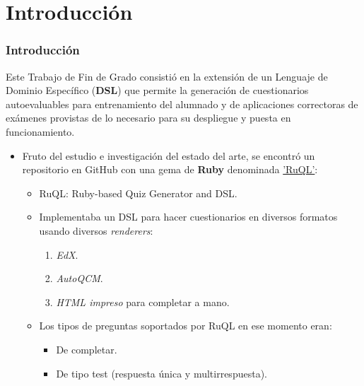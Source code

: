 \documentclass{beamer}
\begin{document}
\section{Introducción}
\begin{frame}[allowframebreaks]
  \frametitle{Introducción}
  
  \begin{center}
    Este Trabajo de Fin de Grado consistió en la extensión de un Lenguaje de Dominio Específico ({\bfseries DSL}) que permite la
    generación de cuestionarios autoevaluables para entrenamiento del alumnado y de aplicaciones correctoras de exámenes
    provistas de lo necesario para su despliegue y puesta en funcionamiento.
  \end{center}
  \framebreak
  
  \begin{itemize}
    \item Fruto del estudio e investigación del estado del arte, se encontró un repositorio en GitHub con una gema de {\bfseries Ruby} denominada 
    \href{http://github.com/saasbook/ruql}{'RuQL'}:
    \begin{itemize}
      \item RuQL: Ruby-based Quiz Generator and DSL.
      \item Implementaba un DSL para hacer cuestionarios en diversos formatos usando diversos \textit{renderers}:
      \begin{enumerate}
        \item \textit{EdX}.
        \item \textit{AutoQCM}.
        \item \textit{HTML impreso} para completar a mano.
      \end{enumerate}
      \item Los tipos de preguntas soportados por RuQL en ese momento eran: 
      \begin{itemize}
        \item De completar.
        \item De tipo test (respuesta única y multirrespuesta).
      \end{itemize}
    \end{itemize}
  \end{itemize}
  \framebreak
  

\end{frame}
\end{document}
